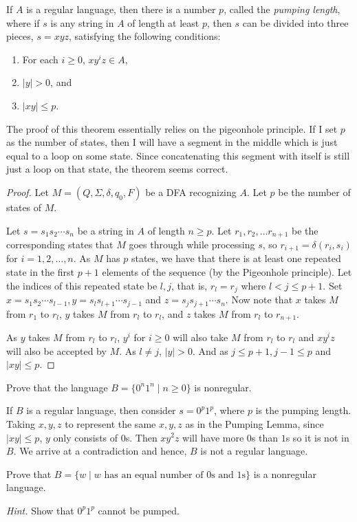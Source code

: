 \begin{theorem}
If $A$ is a regular language, then there is a number $p$, called the \textit{pumping length}, where if $s$ is any string in $A$ of length at least $p$, then $s$ can be divided into three pieces, $s=xyz$, satisfying the following conditions:
\begin{enumerate}
    \item For each $i\geq 0$, $xy^iz\in A$,
    \item $|y|>0$, and
    \item $|xy|\leq p$.
\end{enumerate}
\end{theorem}

The proof of this theorem essentially relies on the pigeonhole principle. If I set $p$ as the number of states, then I will have a segment in the middle which is just equal to a loop on some state. Since concatenating this segment with itself is still just a loop on that state, the theorem seems correct.

\begin{proof}
Let $M=(Q,\Sigma,\delta,q_0,F)$ be a DFA recognizing $A$. Let $p$ be the number of states of $M$.

Let $s=s_1s_2\cdots s_n$ be a string in $A$ of length $n\geq p$. Let $r_1,r_2,\ldots r_{n+1}$ be the corresponding states that $M$ goes through while processing $s$, so $r_{i+1}=\delta(r_i,s_i)$ for $i=1,2,\ldots,n$. As $M$ has $p$ states, we have that there is at least one repeated state in the first $p+1$ elements of the sequence (by the Pigeonhole principle). Let the indices of this repeated state be $l,j$, that is, $r_l=r_j$ where $l< j\leq p+1$. Set $x=s_1s_2\cdots s_{l-1}, y=s_ls_{l+1}\cdots s_{j-1}$ and $z=s_js_{j+1}\cdots s_n$. Now note that $x$ takes $M$ from $r_1$ to $r_l$, $y$ takes $M$ from $r_l$ to $r_l$, and $z$ takes $M$ from $r_l$ to $r_{n+1}$.

As $y$ takes $M$ from $r_l$ to $r_l$, $y^i$ for $i\geq 0$ will also take $M$ from $r_l$ to $r_l$ and $xy^iz$ will also be accepted by $M$. As $l\neq j$, $|y|>0$. And as $j\leq p+1, j-1\leq p$ and $|xy|\leq p$.
\end{proof}

\begin{exercise}
Prove that the language $B=\{0^n1^n\mid n\geq 0\}$ is nonregular.
\end{exercise}
\begin{solution}
If $B$ is a regular language, then consider $s=0^p1^p$, where $p$ is the pumping length. Taking $x,y,z$ to represent the same $x,y,z$ as in the Pumping Lemma, since $|xy|\leq p$, $y$ only consists of $0$s. Then $xy^2z$ will have more $0$s than $1$s so it is not in $B$.
We arrive at a contradiction and hence, $B$ is not a regular language.
\end{solution}
\begin{exercise}
Prove that $B=\{w\mid w\text{ has an equal number of $0$s and $1$s}\}$ is a nonregular language.
\end{exercise}
\textit{Hint. }Show that $0^p1^p$ cannot be pumped.

